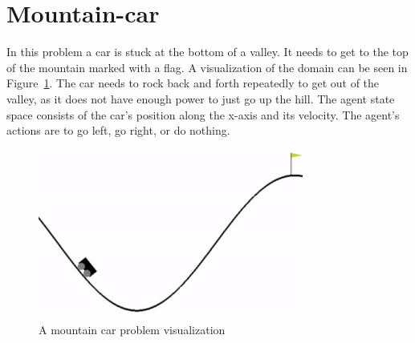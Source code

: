 \documentclass[12pt]{article}
\begin{document}
\section{Mountain-car}
In this problem a car is stuck at the bottom of a valley. It needs to get to the top of the mountain marked with a flag. 
A visualization of the domain can be seen in Figure~\ref{fig:mountain_car}. The car needs to rock back and forth repeatedly to get out of the valley, as it does not have enough power to just go up the hill. The agent state space consists of the car's position along the x-axis and its velocity. The agent's actions are to go left, go right, or do nothing.
\begin{figure}[h!]
    \centering
    \includegraphics{mountain_car.png}
    \caption{A mountain car problem visualization}
    \label{fig:mountain_car}
\end{figure}
\end{document}
